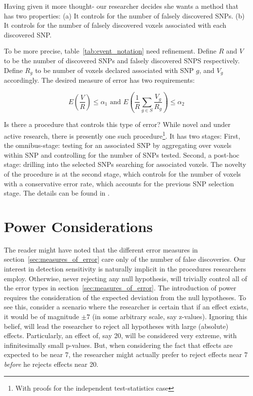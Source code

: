 \documentclass[review,12pt]{article}
\begin{document}
Having given it more thought- our researcher decides she wants a method that has two properties: 
(a) It controls for the number of falsely discovered SNPs. 
(b) It controls for the number of falsely discovered voxels associated with each discovered SNP. 

To be more precise, table~\ref{tab:event_notation} need refinement. Define $R$ and $V$ to be the number of discovered SNPs and falsely discovered SNPS respectively. 
Define $R_g$ to be number of voxels declared associated with SNP $g$, and $V_g$ accordingly. The desired measure of error has two requirements: 

\begin{equation} \label{eq:hirarchial_error}
 E \left(\frac{V}{R} \right)\leq \alpha_1 
\text{ and } 
E \left( \frac{1}{R}\sum_{g \in S} \frac{V_{g}}{R_{g}} \right)\leq \alpha_2
\end{equation}



Is there a procedure that controls this type of error? While novel and under active research, there is presently one such procedure\footnote{With proofs for the independent test-statistics case}. It has two stages: 
First, the omnibus-stage:  testing for an associated SNP by aggregating over voxels within SNP and controlling for the number of SNPs tested. Second, a post-hoc stage: drilling into the selected SNPs searching for associated voxels. The novelty of the procedure is at the second stage, which controls for the number of voxels with a conservative error rate, which accounts for the previous SNP selection stage. 
The details can be found in \citet{benjamini_adjusting_2011}.




\section{\label{sec:power}Power Considerations}

The reader might have noted that the different error measures in section~\ref{sec:measures_of_error} care only of the number of false discoveries. Our interest in detection sensitivity is naturally implicit in the procedures researchers employ. Otherwise, never rejecting any null hypothesis, will trivially control all of the error types in section~\ref{sec:measures_of_error}. 
The introduction of power requires the consideration of the expected deviation from the null hypotheses. To see this, consider a scenario where the researcher is certain that if an effect exists, it would be of magnitude $\pm 7$ (in some arbitrary scale, say z-values). Ignoring this belief, will lead the researcher to reject all hypotheses with large (absolute) effects. Particularly, an effect of, say 20,  will be considered very extreme, with infinitesimally small p-values. But, when considering the fact that effects are expected to be near 7, the researcher might actually prefer to reject effects near 7 \emph{before} he rejects effects near 20. 
\end{document}
